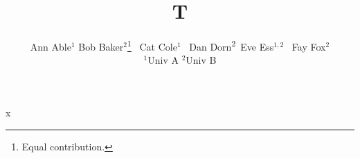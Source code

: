 \documentclass{article}
\begin{document}
\title{T}
\author{Ann Able$^{1}$ \: Bob Baker$^{2}$\thanks{Equal contribution.} \ Cat Cole$^{1}$ \
Dan Dorn\textsuperscript{2}~Eve Ess$^{1,2}$ \, Fay Fox$^{2}$\\
$^1$Univ A \quad $^2$Univ B}
\maketitle
x
\end{document}
